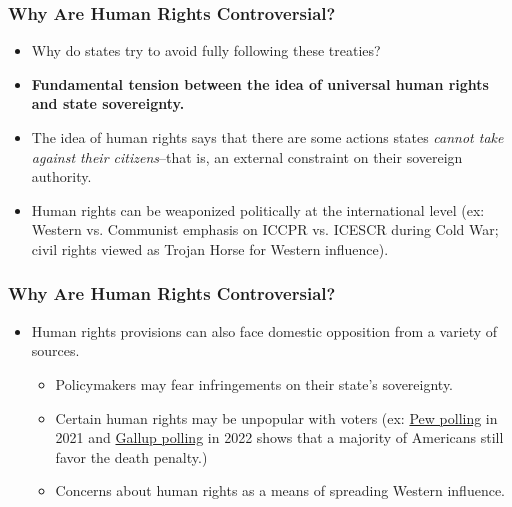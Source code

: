 \documentclass[handout]{beamer}
\begin{document}
\begin{frame} 
	\frametitle{\LARGE{Why Are Human Rights Controversial?}}
	\begin{itemize}
		\item Why do states try to avoid fully following these treaties?
		\item \textbf{Fundamental tension between the idea of universal human rights and state sovereignty.} \pause
		\item The idea of human rights says that there are some actions states \textit{cannot take against their citizens}--that is, an external constraint on their sovereign authority. \pause
		\item Human rights can be weaponized politically at the international level (ex: Western vs. Communist emphasis on ICCPR vs. ICESCR during Cold War; civil rights viewed as Trojan Horse for Western influence).
	\end{itemize}
\end{frame}

\begin{frame} 
	\frametitle{\LARGE{Why Are Human Rights Controversial?}}
	\begin{itemize}
		\item Human rights provisions can also face domestic opposition from a variety of sources. \pause
		\begin{itemize}
			\item Policymakers may fear infringements on their state's sovereignty. \pause
			\item Certain human rights may be unpopular with voters (ex: \href{https://www.pewresearch.org/politics/2021/06/02/most-americans-favor-the-death-penalty-despite-concerns-about-its-administration/}{Pew polling} in 2021 and \href{https://news.gallup.com/poll/404975/steady-americans-support-death-penalty-murderers.aspx}{Gallup polling} in 2022 shows that a majority of Americans still favor the death penalty.) \pause
			\item Concerns about human rights as a means of spreading Western influence.
			
		\end{itemize}
	\end{itemize}
\end{frame}
\end{document}
